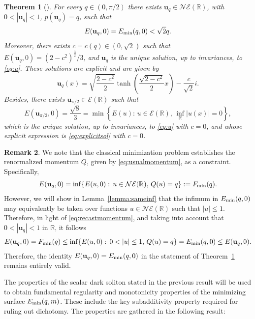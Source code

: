\documentclass[11pt]{article}
\newcommand{\R}{\mathbb{R}}
\newcommand{\boE}{\mathcal{E}}
\newcommand{\NE}{\mathcal{NE}(\mathbb{R})}
\newcommand{\Emin}{E_\textup{min}}
\newcommand{\bu}{\mathbf{u}}
\theoremstyle{plain}
\newtheorem{theorem}{Theorem}[section]
\theoremstyle{definition}
\newtheorem{remark}[theorem]{Remark}
\theoremstyle{remark}
\numberwithin{equation}{section}
\begin{document}
{\begin{theorem}[\cite{bethuel0}]\label{thm:scalar}
    For every $q\in (0,\pi/2)$ there exists $\bu_q\in\NE$, with $0<|\bu_q|<1$, $p(\bu_q)=q$, such that 
    \begin{equation}\label{eq:energygray}
        E(\bu_q,0)=\Emin(q,0)<\sqrt{2}q.
    \end{equation}
    Moreover, there exists $c=c(q)\in (0,\sqrt{2})$ such that $E(\bu_q,0)=(2-c^2)^\frac32/3$, and $\bu_q$ is the unique solution, up to invariances, to \eqref{eq:u}. These solutions are explicit and are given by 
\begin{equation}\label{eq:explicitsol}
    \bu_q(x)=\sqrt{\frac{2-c^2}{{2}}}\tanh\left(\frac{\sqrt{2-c^2}}{2}x\right)-\frac{c}{\sqrt{2}}i.
\end{equation}
    Besides, there exists $\bu_{\pi/2}\in\boE(\R)$ such that
    \begin{equation}\label{eq:energyblack}
        E(\bu_{\pi/2},0)=\frac{\sqrt{8}}{3}=\min\left\{E(u):\,u\in\boE(\R),\,\inf_\R|u(x)|=0\right\},
    \end{equation}
    which is the unique solution, up to invariances, to \eqref{eq:u} with $c=0$, and whose explicit expression is \eqref{eq:explicitsol} with $c=0$.
\end{theorem}

    \begin{remark}
        We note that the classical minimization problem establishes the renormalized momentum $Q$, given by \eqref{eq:usualmomentum}, as a constraint. Specifically, 
    \begin{equation*}
    E(\bu_q,0)=\inf\{E(u,0):\, u\in \NE,\, Q(u)=q\}:=F_{\textup{min}}(q).
    \end{equation*}
    However, we will show in Lemma~\ref{lemma:sameinf} that the infimum in $\Emin(q,0)$ may equivalently be taken over functions $u\in\NE$ such that $|u|\leq 1$. Therefore, in light of \eqref{eq:recastmomentum}, and taking into account that $0<|\bu_q|<1$ in $\R$, it follows 
    \[E(\bu_q,0)=F_{\textup{min}}(q)\leq\inf\{E(u,0):\, 0<|u|\leq 1,\, Q(u)=q\}=\Emin(q,0)\leq E(\bu_q,0).\]
    Therefore, the identity $E(\bu_q,0)=\Emin(q,0)$ in the statement of Theorem~\ref{thm:scalar} remains entirely valid.
    \end{remark}
    


The properties of the scalar dark soliton stated in the previous result will be used to obtain fundamental regularity and monotonicity properties of the minimizing surface $\Emin(q,m)$. These include the key subadditivity property required for ruling out dichotomy. The properties are gathered in the following result:

}
\end{document}
